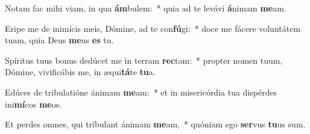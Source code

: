 \item Notam fac mihi viam, in qua \textbf{ám}bulem:~* quia ad te levávi \textbf{á}nimam \textbf{me}am.
\item Eripe me de inimícis meis, Dómine, ad te con\textbf{fú}gi:~* doce me fácere voluntátem tuam, quia Deus \textbf{me}us \textbf{es} tu.
\item Spíritus tuus bonus dedúcet me in terram \textbf{rec}tam:~* propter nomen tuum, Dómine, vivificábis me, in æqui\textbf{tá}te \textbf{tu}a.
\item Edúces de tribulatióne ánimam \textbf{me}am:~* et in misericórdia tua dispérdes ini\textbf{mí}cos \textbf{me}os.
\item Et perdes omnes, qui tríbulant ánimam \textbf{me}am,~* quóniam ego \textbf{ser}vus \textbf{tu}us sum.
